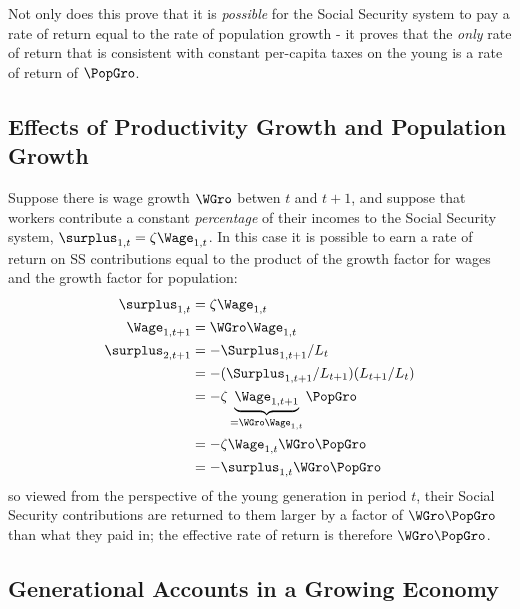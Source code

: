 \documentclass{handout}
\begin{document}
Not only does this prove that it is {\it possible} for the Social 
Security system to pay a rate of return equal to the rate of 
population growth - it proves that the {\it only} rate of return that 
is consistent with constant per-capita taxes on the young is a rate of 
return of $\PopGro$.  


\subsection{Effects of Productivity Growth and Population Growth}

Suppose there is wage growth ${\WGro}$ betwen $t$ and $t+1$, and 
suppose that workers contribute a constant {\it percentage} of their 
incomes to the Social Security system, $\surplus_{1,t} = \zeta \Wage_{1,t}$.  In 
this case it is possible to earn a rate of return on SS contributions 
equal to the product of the growth factor for wages and the growth 
factor for population:
\begin{equation}\begin{gathered}\begin{aligned}
        \surplus_{1,t} & =  \zeta \Wage_{1,t}  \\
        \Wage_{1,t+1} & =  {\WGro}\Wage_{1,t}  \\
        \surplus_{2,t+1} & =  -\Surplus_{1,t+1}/L_{t}
\\  & =  -(\Surplus_{1,t+1}/L_{t+1})(L_{t+1}/L_{t})
\\  & =  -\zeta \underbrace{\Wage_{1,t+1}}_{= {\WGro} \Wage_{1,t}} \PopGro
\\  & =  -\zeta \Wage_{1,t}{\WGro} \PopGro
\\  & =  -\surplus_{1,t} {\WGro}\PopGro
\end{aligned}\end{gathered}\end{equation}
so viewed from the perspective of the young generation in period $t$, 
their Social Security contributions are returned to them larger by a 
factor of ${\WGro}\PopGro$ than what they paid in; the effective rate of return is 
therefore ${\WGro}\PopGro$.

\subsection{Generational Accounts in a Growing Economy}
\end{document}
